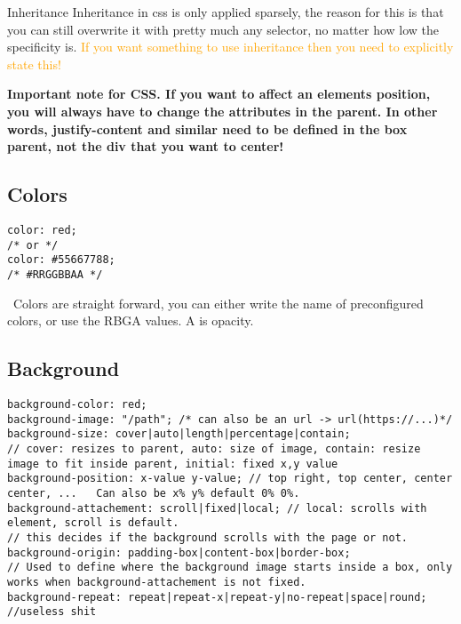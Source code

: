 \documentclass[main.tex,fontsize=6pt,paper=a4,paper=landscape,DIV=calc,]{scrartcl}
\begin{document}
\begin{multicols*}{4}
Inheritance  
Inheritance in css is only applied sparsely, the reason for this is that you can still overwrite it with pretty much any selector, no matter how low the specificity is.\newline
\textcolor{orange}{If you want something to use inheritance then you need to explicitly state this!}



\textbf{Important note for CSS. If you want to affect an elements position, you will always have to change the attributes in the parent. \newline
In other words, justify-content and similar need to be defined in the box parent, not the div that you want to center!}

\subsection{Colors}

\begin{lstlisting}
color: red;
/* or */
color: #55667788;
/* #RRGGBBAA */
\end{lstlisting}
\, \newline
Colors are straight forward, you can either write the name of preconfigured colors, or use the RBGA values. \newline A is opacity.




\subsection{Background}

\begin{lstlisting}
background-color: red;
background-image: "/path"; /* can also be an url -> url(https://...)*/
background-size: cover|auto|length|percentage|contain;
// cover: resizes to parent, auto: size of image, contain: resize image to fit inside parent, initial: fixed x,y value
background-position: x-value y-value; // top right, top center, center center, ...   Can also be x% y% default 0% 0%.
background-attachement: scroll|fixed|local; // local: scrolls with element, scroll is default.
// this decides if the background scrolls with the page or not.
background-origin: padding-box|content-box|border-box; 
// Used to define where the background image starts inside a box, only works when background-attachement is not fixed.
background-repeat: repeat|repeat-x|repeat-y|no-repeat|space|round; //useless shit
\end{lstlisting}
\, \newline


\end{multicols*}
\end{document}
